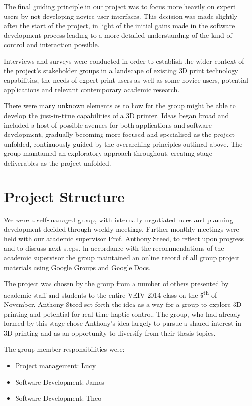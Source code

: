 \documentclass[pdftex, 11pt]{report} %
\begin{document}
The final guiding principle in our project was to focus more heavily on expert users by not developing novice user interfaces. This decision was made slightly after the start of the project, in light of the initial gains made in the software development process leading to a more detailed understanding of the kind of control and interaction possible. 

Interviews and surveys were conducted in order to establish the wider context of the project's stakeholder groups in a landscape of existing 3D print technology capabilities, the needs of expert print users as well as some novice users, potential applications and relevant contemporary academic research.  

There were many unknown elements as to how far the group might be able to develop the just-in-time capabilities of a 3D printer. Ideas began broad and included a host of possible avenues for both applications and software development, gradually becoming more focused and specialised as the project unfolded, continuously guided by the overarching principles outlined above. The group maintained an exploratory approach throughout, creating stage deliverables as the project unfolded. 




\section{Project Structure}
We were a self-managed group, with internally negotiated roles and planning development decided through weekly meetings. Further monthly meetings were held with our academic supervisor Prof. Anthony Steed, to reflect upon progress and to discuss next steps.  In accordance with the recommendations of the academic supervisor the group maintained an online record of all group project materials using Google Groups and Google Docs. 

The project was chosen by the group from a number of others presented by academic staff and students to the entire VEIV 2014 class on the 6\textsuperscript{th} of November. Anthony Steed set forth the idea as a way for a group to explore 3D printing and potential for real-time haptic control. The group, who had already formed by this stage chose Anthony's idea largely to pursue a shared interest in 3D printing and as an opportunity to diversify from their thesis topics. 

The group member responsibilities were:
\begin{itemize}
\item Project management: Lucy
\item Software Development: James
\item Software Development: Theo
\end{itemize}
\end{document}
